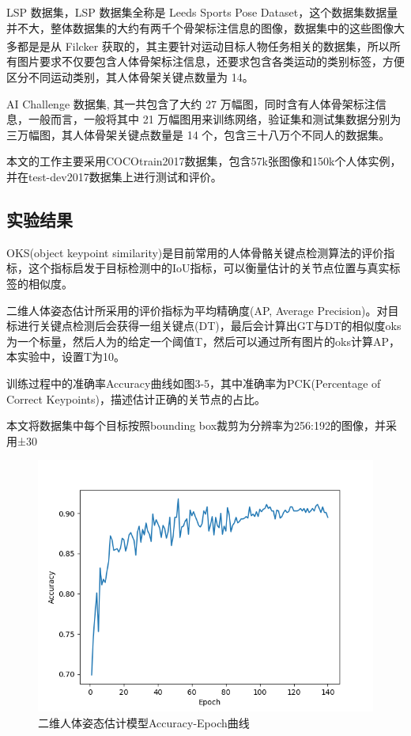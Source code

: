 LSP 数据集，LSP 数据集全称是 Leeds Sports Pose Dataset，这个数据集数据量并不大，整体数据集的大约有两千个骨架标注信息的图像，数据集中的这些图像大多都是是从 Filcker 获取的\textsuperscript{\cite{p17}}，其主要针对运动目标人物任务相关的数据集，所以所有图片要求不仅要包含人体骨架标注信息，还要求包含各类运动的类别标签，方便区分不同运动类别，其人体骨架关键点数量为 14。

AI Challenge 数据集, 其一共包含了大约 27 万幅图，同时含有人体骨架标注信息，一般而言，一般将其中 21 万幅图用来训练网络，验证集和测试集数据分别为三万幅图，其人体骨架关键点数量是 14 个，包含三十八万个不同人的数据集。

本文的工作主要采用COCOtrain2017数据集，包含57k张图像和150k个人体实例，并在test-dev2017数据集上进行测试和评价。

\subsection{实验结果}{}
OKS(object keypoint similarity)是目前常用的人体骨骼关键点检测算法的评价指标，这个指标启发于目标检测中的IoU指标，可以衡量估计的关节点位置与真实标签的相似度。

二维人体姿态估计所采用的评价指标为平均精确度(AP, Average Precision)。对目标进行关键点检测后会获得一组关键点(DT)，最后会计算出GT与DT的相似度oks为一个标量，然后人为的给定一个阈值T，然后可以通过所有图片的oks计算AP，本实验中，设置T为10。

训练过程中的准确率Accuracy曲线如图3-5，其中准确率为PCK(Percentage of Correct Keypoints)，描述估计正确的关节点的占比。

本文将数据集中每个目标按照bounding box裁剪为分辨率为256:192的图像，并采用±30%

\begin{figure}[h]
	\centering
	\includegraphics[scale=0.4]{figures/20.png}
	\caption{二维人体姿态估计模型Accuracy-Epoch曲线}
	\label{fig:f20}
\end{figure}

